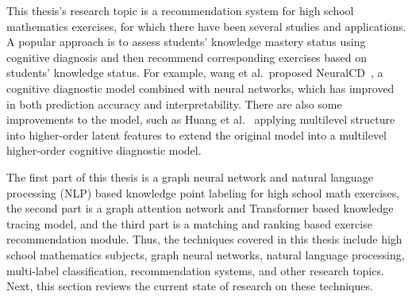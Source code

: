This thesis's research topic is a recommendation system for high school mathematics exercises, for which there have been several studies and applications. A popular approach is to assess students' knowledge mastery status using cognitive diagnosis and then recommend corresponding exercises based on students' knowledge status. For example, wang et al.\ proposed NeuralCD~\cite{wang2020neural}, a cognitive diagnostic model combined with neural networks, which has improved in both prediction accuracy and interpretability. There are also some improvements to the model, such as Huang et al.~\cite{huang2017hcdm} applying multilevel structure into higher-order latent features to extend the original model into a multilevel higher-order cognitive diagnostic model.


The first part of this thesis is a graph neural network and natural language processing (NLP) based knowledge point labeling for high school math exercises, the second part is a graph attention network and Transformer based knowledge tracing model, and the third part is a matching and ranking based exercise recommendation module. Thus, the techniques covered in this thesis include high school mathematics subjects, graph neural networks, natural language processing, multi-label classification, recommendation systems, and other research topics. Next, this section reviews the current state of research on these techniques.

